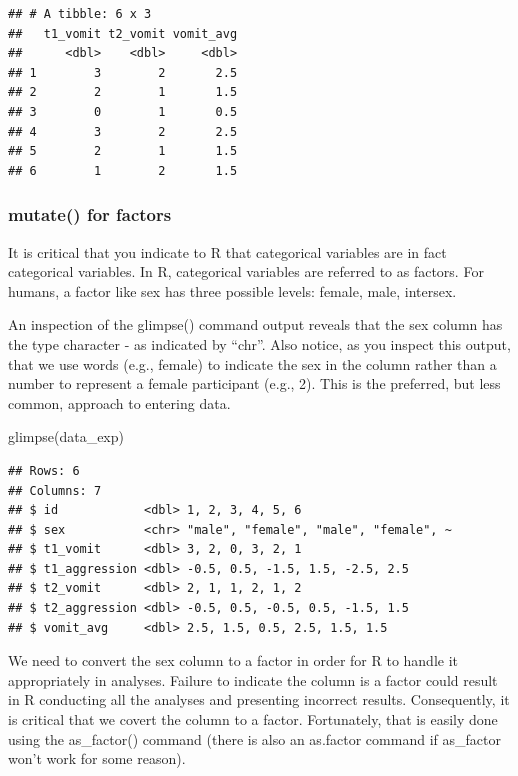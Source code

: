 \documentclass[
]{krantz}
\makeatletter
\newenvironment{Shaded}{\begin{snugshade}}{\end{snugshade}}
\newcommand{\FunctionTok}[1]{\textcolor[rgb]{0,0,0}{#1}}
\newcommand{\NormalTok}[1]{#1}
\newenvironment{kframe}{%
\medskip{}
\setlength{\fboxsep}{.8em}
 \def\at@end@of@kframe{}%
 \ifinner\ifhmode%
  \def\at@end@of@kframe{\end{minipage}}%
  \begin{minipage}{\columnwidth}%
 \fi\fi%
 \def\FrameCommand##1{\hskip\@totalleftmargin \hskip-\fboxsep
 \colorbox{shadecolor}{##1}\hskip-\fboxsep
     \hskip-\linewidth \hskip-\@totalleftmargin \hskip\columnwidth}%
 \MakeFramed {\advance\hsize-\width
   \@totalleftmargin\z@ \linewidth\hsize
   \@setminipage}}%
 {\par\unskip\endMakeFramed%
 \at@end@of@kframe}
\renewenvironment{Shaded}{\begin{kframe}}{\end{kframe}}
\makeatother
\begin{document}
\begin{verbatim}
## # A tibble: 6 x 3
##   t1_vomit t2_vomit vomit_avg
##      <dbl>    <dbl>     <dbl>
## 1        3        2       2.5
## 2        2        1       1.5
## 3        0        1       0.5
## 4        3        2       2.5
## 5        2        1       1.5
## 6        1        2       1.5
\end{verbatim}

\hypertarget{mutate-for-factors}{%
\subsubsection{mutate() for factors}\label{mutate-for-factors}}

It is critical that you indicate to R that categorical variables are in fact categorical variables. In R, categorical variables are referred to as factors. For humans, a factor like sex has three possible levels: female, male, intersex.

An inspection of the glimpse() command output reveals that the sex column has the type character - as indicated by ``chr''. Also notice, as you inspect this output, that we use words (e.g., female) to indicate the sex in the column rather than a number to represent a female participant (e.g., 2). This is the preferred, but less common, approach to entering data.

\begin{Shaded}
\begin{Highlighting}[]
\FunctionTok{glimpse}\NormalTok{(data\_exp)}
\end{Highlighting}
\end{Shaded}

\begin{verbatim}
## Rows: 6
## Columns: 7
## $ id            <dbl> 1, 2, 3, 4, 5, 6
## $ sex           <chr> "male", "female", "male", "female", ~
## $ t1_vomit      <dbl> 3, 2, 0, 3, 2, 1
## $ t1_aggression <dbl> -0.5, 0.5, -1.5, 1.5, -2.5, 2.5
## $ t2_vomit      <dbl> 2, 1, 1, 2, 1, 2
## $ t2_aggression <dbl> -0.5, 0.5, -0.5, 0.5, -1.5, 1.5
## $ vomit_avg     <dbl> 2.5, 1.5, 0.5, 2.5, 1.5, 1.5
\end{verbatim}

We need to convert the sex column to a factor in order for R to handle it appropriately in analyses. Failure to indicate the column is a factor could result in R conducting all the analyses and presenting incorrect results. Consequently, it is critical that we covert the column to a factor. Fortunately, that is easily done using the as\_factor() command (there is also an as.factor command if as\_factor won't work for some reason).
\end{document}
